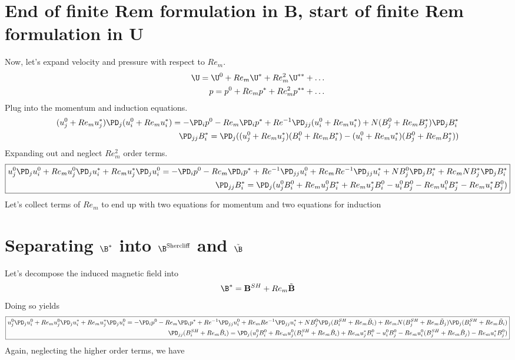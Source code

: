 \documentclass[11pt]{article}
\newcommand{\BS}{B^{SH}}
\newcommand{\BT}{\tilde{B}}
\begin{document}
\section{End of finite Rem formulation in B, start of finite Rem formulation in U}
Now, let's expand velocity and pressure with respect to $Re_m$.
\begin{equation}\begin{aligned}
	\U = \U^0 + Re_m \U^* + Re_m^2 \U^{**} + \hdots \\
	p = p^0 + Re_m p^* + Re_m^2 p^{**} + \hdots
\end{aligned} \end{equation}
Plug into the momentum and induction equations.
\small\begin{equation}\begin{aligned}
(u_j^0+Re_m u_j^*)\PD_j (u_i^0+Re_m u_i^*) =-\PD_i p^0-Re_m\PD_i p^*+ Re^{-1} \PD_{jj} (u_i^0+Re_m u_i^*) + N (B_j^0+Re_m B_j^*) \PD_j B_i^* \\
\PD_{jj} B_i^* =  \PD_j ((u_j^0+Re_m u_j^*) (B_i^0 + Re_m B_i^{*}) - (u_i^0+Re_m u_i^*) (B_j^0+Re_m B_j^{*}))
\end{aligned}\end{equation}\normalsize
Expanding out and neglect $Re_m^2$ order terms.
\begin{equation}\boxed{\begin{aligned}
u_j^0 \PD_j u_i^0 +
Re_m u_j^0 \PD_j u_i^* +
Re_m u_j^* \PD_j u_i^0
= -\PD_i p^0 - Re_m\PD_i p^*+ Re^{-1} \PD_{jj} u_i^0 + Re_m Re^{-1} \PD_{jj} u_i^* + N B_j^0 \PD_j B_i^* + Re_m N B_j^* \PD_j B_i^* \\
\PD_{jj} B_i^* = \PD_j ( u_j^0 B_i^0 + Re_m u_j^0 B_i^{*} + Re_m u_j^* B_i^0 - u_i^0 B_j^0 - Re_m u_i^0 B_j^{*} - Re_m u_i^* B_j^0)
\end{aligned}}\end{equation}
Let's collect terms of $Re_m$ to end up with two equations for momentum and two equations for induction

\section{Separating \texorpdfstring{$\B^*$}{} into \texorpdfstring{$\B^{\text{Shercliff}}$}{} and \texorpdfstring{$\tilde{\B}$}{}}

Let's decompose the induced magnetic field into
\begin{equation}
	\B^* = \mathbf{B}^{SH} + Re_m \tilde{\mathbf{B}}
\end{equation}
Doing so yields
\tiny\begin{equation}\boxed{\begin{aligned}
u_j^0 \PD_j u_i^0 +
Re_m u_j^0 \PD_j u_i^* +
Re_m u_j^* \PD_j u_i^0
= -\PD_i p^0 - Re_m\PD_i p^*+ Re^{-1} \PD_{jj} u_i^0 + Re_m Re^{-1} \PD_{jj} u_i^* + N B_j^0 \PD_j (\BS_i+Re_m \BT_i) + Re_m N (\BS_j+Re_m \BT_j) \PD_j (\BS_i+Re_m \BT_i) \\
\PD_{jj} (\BS_i+Re_m \BT_i) = \PD_j ( u_j^0 B_i^0 + Re_m u_j^0 (\BS_i+Re_m \BT_i) + Re_m u_j^* B_i^0 - u_i^0 B_j^0 - Re_m u_i^0 (\BS_j+Re_m \BT_j) - Re_m u_i^* B_j^0)
\end{aligned}}\end{equation}\normalsize
Again, neglecting the higher order terms, we have
\end{document}
